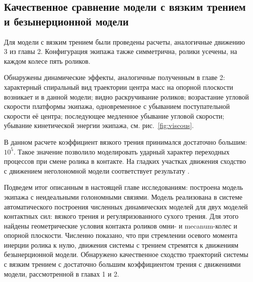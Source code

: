 \subsection{Качественное сравнение модели с вязким трением и безынерционной модели}

Для модели с вязким трением были проведены расчеты, аналогичные движению 3 из главы 2. Конфигурация экипажа также симметрична, ролики усечены, на каждом колесе пять роликов.

Обнаружены динамические эффекты, аналогичные полученным в главе 2: характерный спиральный вид траектории центра масс на опорной плоскости возникает и в данной модели; видно раскручивание роликов; возрастание угловой скорости платформы экипажа, одновременное с убыванием поступательной скорости её центра; последующее медленное убывание угловой скорости; убывание кинетической энергии экипажа, см. рис.~\ref{fig:viscous}.

В данном расчете коэффициент вязкого трения принимался достаточно большим: $10^{5}$. Такое значение позволило моделировать ударный характер переходных процессов при смене ролика в контакте. На гладких участках движения сходство с движением неголономной модели соответствует результату \cite{karapetyan1981negolonom}.

Подведем итог описанным в настоящей главе исследованиям: построена модель экипажа с неидеальными голономными связями. Модель реализована в системе автоматического построения численных динамических моделей для двух моделей контактных сил: вязкого трения и регуляризованного сухого трения. Для этого найдены геометрические условия контакта роликов омни- и mecanum-колес и опорной плоскости. Численно показано, что при стремлении осевого момента инерции ролика к нулю, движения системы с трением стремятся к движениям безынерционной модели. Обнаружено качественное сходство траекторий системы с вязким трением с достаточно большим коэффициентом трения с движениями модели, рассмотренной в главах 1 и 2.




